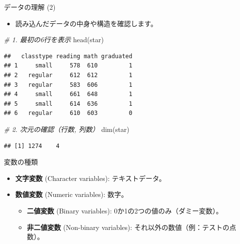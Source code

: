 \documentclass[
  ignorenonframetext,
]{beamer}
\newenvironment{Shaded}{\begin{snugshade}}{\end{snugshade}}
\newcommand{\CommentTok}[1]{\textcolor[rgb]{0.56,0.35,0.01}{\textit{#1}}}
\newcommand{\FunctionTok}[1]{\textcolor[rgb]{0.00,0.00,0.00}{#1}}
\newcommand{\NormalTok}[1]{#1}
\providecommand{\tightlist}{%
  \setlength{\itemsep}{0pt}\setlength{\parskip}{0pt}}
\begin{document}
\begin{frame}[fragile]{データの理解 (2)}
\protect\hypertarget{ux30c7ux30fcux30bfux306eux7406ux89e3-2}{}
\begin{itemize}
\tightlist
\item
  読み込んだデータの中身や構造を確認します。
\end{itemize}

\scriptsize

\begin{Shaded}
\begin{Highlighting}[]
\CommentTok{\# 1. 最初の6行を表示}
\FunctionTok{head}\NormalTok{(star)}
\end{Highlighting}
\end{Shaded}

\begin{verbatim}
##   classtype reading math graduated
## 1     small     578  610         1
## 2   regular     612  612         1
## 3   regular     583  606         1
## 4     small     661  648         1
## 5     small     614  636         1
## 6   regular     610  603         0
\end{verbatim}

\begin{Shaded}
\begin{Highlighting}[]
\CommentTok{\# 2. 次元の確認（行数, 列数）}
\FunctionTok{dim}\NormalTok{(star)}
\end{Highlighting}
\end{Shaded}

\begin{verbatim}
## [1] 1274    4
\end{verbatim}

\normalsize
\end{frame}

\begin{frame}{変数の種類}
\protect\hypertarget{ux5909ux6570ux306eux7a2eux985e}{}
\begin{itemize}
\tightlist
\item
  \textbf{文字変数} (Character variables): テキストデータ。
\item
  \textbf{数値変数} (Numeric variables): 数字。

  \begin{itemize}
  \tightlist
  \item
    \textbf{二値変数} (Binary variables):
    0か1の2つの値のみ（ダミー変数）。
  \item
    \textbf{非二値変数} (Non-binary variables):
    それ以外の数値（例：テストの点数）。
  \end{itemize}
\end{itemize}
\end{frame}
\end{document}
